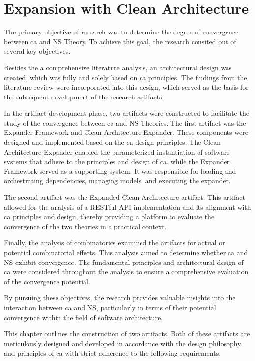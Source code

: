 \section{Expansion with Clean Architecture}

The primary objective of 
\parencite{koks_convergence_2023} research was to determine the degree of convergence
between \gls{ca} and NS Theory. To achieve this goal, the research consited out of several
key objectives.

Besides the a comprehensive literature analysis, an architectural design was created,
which was fully and solely based on \gls{ca} principles. The findings from the literature
review were incorporated into this design, which served as the basis for the subsequent
development of the research artifacts.

In the artifact development phase, two artifacts were constructed to facilitate the study
of the convergence between \gls{ca} and NS Theories. The first artifact was the Expander
Framework and Clean Architecture Expander. These components were designed and implemented
based on the \gls{ca} design principles. The Clean Architecture Expander enabled the
parameterized instantiation of software systems that adhere to the principles and design
of \gls{ca}, while the Expander Framework served as a supporting system. It was responsible for
loading and orchestrating dependencies, managing models, and executing the expander.

The second artifact was the Expanded Clean Architecture artifact. This artifact allowed
for the analysis of a RESTful API implementation and its alignment with \gls{ca}
principles and design, thereby providing a platform to evaluate the convergence of the two
theories in a practical context.

Finally, the analysis of combinatorics examined the artifacts for actual or potential
combinatorial effects. This analysis aimed to determine whether \gls{ca} and NS exhibit
convergence. The fundamental principles and architectural design of \gls{ca} were
considered throughout the analysis to ensure a comprehensive evaluation of the convergence
potential.

By pursuing these objectives, the research provides valuable insights into the interaction
between \gls{ca} and NS, particularly in terms of their potential convergence within the field
of software architecture.

This chapter outlines the construction of two artifacts. Both of these artifacts are
meticulously designed and developed in accordance with the design philosophy and
principles of \gls{ca} with strict adherence to the following requirements.